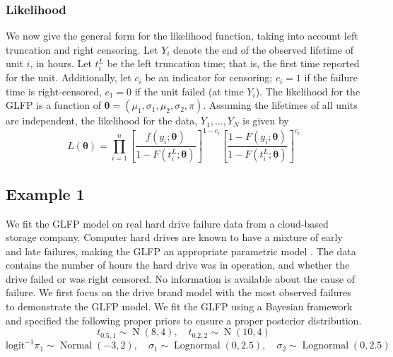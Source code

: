 \documentclass[12pt]{article}
\newcommand{\op}{\operatorname}
\begin{document}
\subsubsection{Likelihood}
We now give the general form for the likelihood function, taking into account left truncation and right censoring.  Let $Y_{i}$ denote the end of the observed lifetime of unit $i$, in hours.  Let $t_i^L$ be the left truncation time; that is, the first time reported for the unit.  Additionally, let $c_i$ be an indicator for censoring; $c_i=1$ if the failure time is right-censored, $c_1=0$ if the unit failed (at time $Y_i$). The likelihood for the GLFP is a function of $\bm{\theta} = (\mu_1, \sigma_1, \mu_2, \sigma_2, \pi)$.  Assuming the lifetimes of all units are independent, the likelihood for the data, $Y_1,\ldots,Y_N$ is given by
\begin{equation*}
L(\bm{\theta})= \prod_{i=1}^{n} \left[\frac{f(y_i;\bm{\theta})}{1-F(t_i^L;\bm{\theta})}\right]^{1-c_i} \left[ \frac{1-F(y_i;\bm{\theta})}{1-F(t_i^L;\bm{\theta})} \right]^{c_i}
\end{equation*}

\subsection{Example 1}
We fit the GLFP model on real hard drive failure data from a cloud-based storage company.  Computer hard drives are known to have a mixture of early and late failures, making the GLFP an appropriate parametric model \cite{chan}.  The data contains the number of hours the hard drive was in operation, and whether the drive failed or was right censored.  No information is available about the cause of failure.  We first focus on the drive brand model with the most observed failures to demonstrate the GLFP model.  We fit the GLFP using a Bayesian framework and specified the following proper priors to ensure a proper posterior distribution.
$$t_{0.5,1} \sim \op{N}(8,4), \quad t_{0.2,2} \sim \op{N}(10,4)$$
$$\mbox{logit}^{-1}\pi_1 \sim \op{Normal}(-3,2),\quad \sigma_1 \sim \op{Lognormal}(0, 2.5), \quad \sigma_2 \sim \op{Lognormal}(0, 2.5) $$
\end{document}
